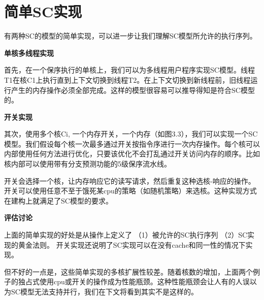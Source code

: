 \documentclass[UTF-8]{ctexrep}
\begin{document}
\section{简单SC实现}
有两种SC的模型的简单实现，可以进一步让我们理解SC模型所允许的执行序列。
\par \textbf{单核多线程实现}
\par 首先，在一个保序执行的单核上，我们可以为多线程用户程序实现SC模型。线程T1在核C1上执行直到上下文切换到线程T2。在上下文切换到新线程前，旧线程运行产生的内存操作必须全部完成。这样的模型很容易可以推导得知是符合SC模型的。
\par \textbf{开关实现}
\par 其次，使用多个核Ci,  一个内存开关，一个内存（如图3.3），我们可以实现一个SC模型。我们假设每个核一次最多通过开关按指令序进行一次内存操作。每个核可以内部使用任何方法进行优化，只要该优化不会打乱通过开关访问内存的顺序。比如核内部可以使用带有分支预测功能的5级保序流水线。
\par 开关会选择一个核，让内存响应它的读写请求，然后重复这种选核-响应的操作。开关可以使用任意不至于饿死某cpu的策略（如随机策略）来选核。这种实现方式在建构上就满足了SC模型的要求。
\par \textbf{评估讨论}
\par 上面的简单实现的好处是从操作上定义了 （1）被允许的SC执行序列  （2）SC实现的黄金法则。 开关实现还说明了SC实现可以在没有cache和同一性的情况下实现。
\par 但不好的一点是，这些简单实现的多核扩展性较差。随着核数的增加，上面两个例子的独占式使用cpu或开关的操作成为性能瓶颈。这种性能瓶颈会让人有的人误以为SC模型无法支持并行，我们在下文将看到其实不是这样的。
\end{document}
